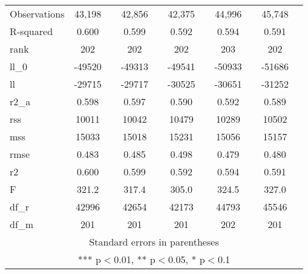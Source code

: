 \documentclass[]{article}
\begin{document}
\begin{tabular}{lcccccccccc}
Observations & 43,198 &  & 42,856 &  & 42,375 &  & 44,996 &  & 45,748 &  \\
R-squared & 0.600 &  & 0.599 &  & 0.592 &  & 0.594 &  & 0.591 &  \\
rank & 202 &  & 202 &  & 202 &  & 203 &  & 202 &  \\
ll\_0 & -49520 &  & -49313 &  & -49541 &  & -50933 &  & -51686 &  \\
ll & -29715 &  & -29717 &  & -30525 &  & -30651 &  & -31252 &  \\
r2\_a & 0.598 &  & 0.597 &  & 0.590 &  & 0.592 &  & 0.589 &  \\
rss & 10011 &  & 10042 &  & 10479 &  & 10289 &  & 10502 &  \\
mss & 15033 &  & 15018 &  & 15231 &  & 15056 &  & 15157 &  \\
rmse & 0.483 &  & 0.485 &  & 0.498 &  & 0.479 &  & 0.480 &  \\
r2 & 0.600 &  & 0.599 &  & 0.592 &  & 0.594 &  & 0.591 &  \\
F & 321.2 &  & 317.4 &  & 305.0 &  & 324.5 &  & 327.0 &  \\
df\_r & 42996 &  & 42654 &  & 42173 &  & 44793 &  & 45546 &  \\
 df\_m & 201 &  & 201 &  & 201 &  & 202 &  & 201 &  \\ \hline
\multicolumn{11}{c}{ Standard errors in parentheses} \\
\multicolumn{11}{c}{ *** p$<$0.01, ** p$<$0.05, * p$<$0.1} \\
\end{tabular}
\end{document}
